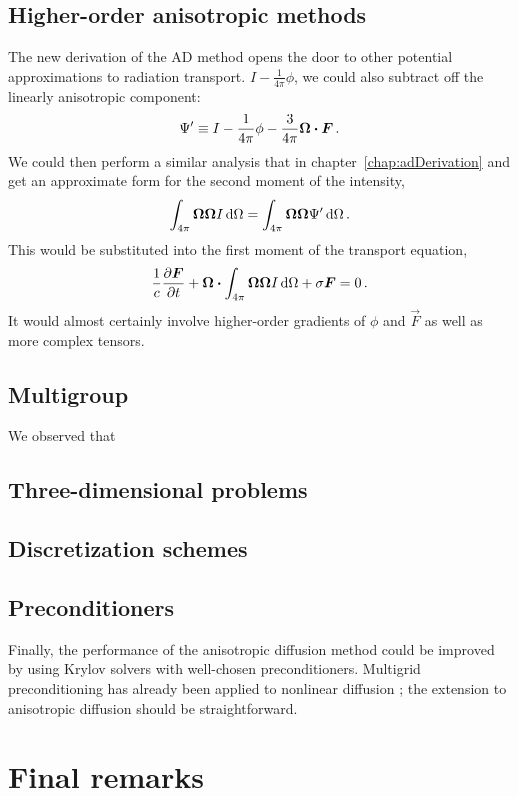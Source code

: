 \subsection{Higher-order anisotropic \texorpdfstring{\PN}{PN} methods}
The new derivation of the AD method opens the door to other potential
approximations to radiation transport.  $I -
\frac{1}{4\pi}\phi$, we could also subtract off the linearly anisotropic
component:
\begin{equation*}
  \Psi' \equiv I - \frac{1}{4\pi}\phi - \frac{3}{4\pi} \bm{\Omega} \bm{\cdot}
  \bm{F}\,.
\end{equation*}
We could then perform a similar analysis that in chapter~\ref{chap:adDerivation}
and get an approximate form for the second moment of the intensity,
\begin{equation*}
  \int_{4\pi} \bm{\Omega}\bm{\Omega} I \mathop{}\!\mathrm{d} \Omega
  = \int_{4\pi} \bm{\Omega}\bm{\Omega} \Psi' \mathop{}\!\mathrm{d} \Omega \,.
\end{equation*}
This would be substituted into the first moment of the transport equation,
\begin{equation*}
  \frac{1}{c}\frac{\partial \bm{F}}{\partial t}
  + \bm{\Omega} \bm{\cdot} \int_{4\pi} \bm{\Omega}\bm{\Omega} I \mathop{}\!\mathrm{d} \Omega
  + \sigma \bm{F}
  = 0 \,.
\end{equation*}
It would almost certainly involve higher-order gradients of $\phi$ and $\vec{F}$
as well as more complex tensors.

\subsection{Multigroup}

We observed that 

\subsection{Three-dimensional problems}

\subsection{Discretization schemes}

\subsection{Preconditioners}

Finally, the performance of the anisotropic diffusion method could be improved
by using Krylov solvers with well-chosen preconditioners. Multigrid
preconditioning has already been applied to nonlinear diffusion \cite{Rid1999};
the extension to anisotropic diffusion should be straightforward.

\section{Final remarks}



